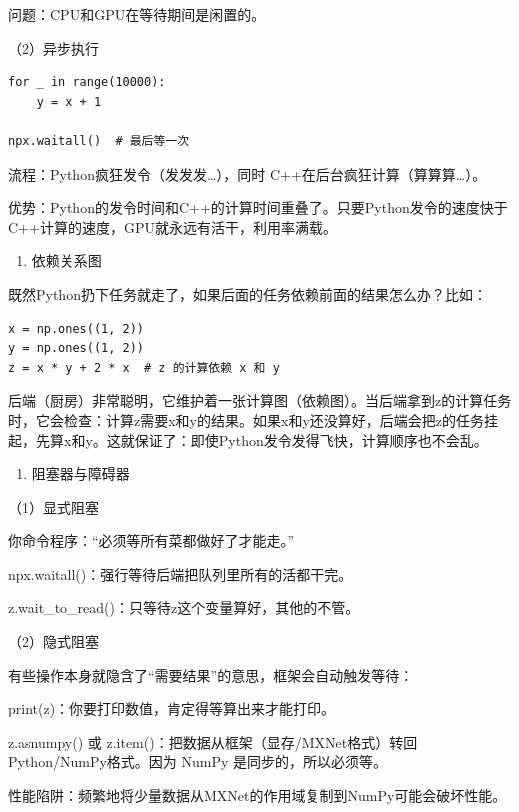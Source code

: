 问题：CPU和GPU在等待期间是闲置的。

（2）异步执行

\begin{verbatim}
for _ in range(10000):
    y = x + 1

npx.waitall()  # 最后等一次
\end{verbatim}

流程：Python疯狂发令（发发发\ldots），同时 C++在后台疯狂计算（算算算\ldots）。

优势：Python的发令时间和C++的计算时间重叠了。只要Python发令的速度快于C++计算的速度，GPU就永远有活干，利用率满载。

\begin{enumerate}
\def\labelenumi{\arabic{enumi}.}
\setcounter{enumi}{2}
\tightlist
\item
  依赖关系图
\end{enumerate}

既然Python扔下任务就走了，如果后面的任务依赖前面的结果怎么办？比如：

\begin{verbatim}
x = np.ones((1, 2))
y = np.ones((1, 2))
z = x * y + 2 * x  # z 的计算依赖 x 和 y
\end{verbatim}

后端（厨房）非常聪明，它维护着一张计算图（依赖图）。当后端拿到z的计算任务时，它会检查：计算z需要x和y的结果。如果x和y还没算好，后端会把z的任务挂起，先算x和y。这就保证了：即使Python发令发得飞快，计算顺序也不会乱。

\begin{enumerate}
\def\labelenumi{\arabic{enumi}.}
\setcounter{enumi}{3}
\tightlist
\item
  阻塞器与障碍器
\end{enumerate}

（1）显式阻塞

你命令程序：``必须等所有菜都做好了才能走。''

npx.waitall()：强行等待后端把队列里所有的活都干完。

z.wait\_to\_read()：只等待z这个变量算好，其他的不管。

（2）隐式阻塞

有些操作本身就隐含了``需要结果''的意思，框架会自动触发等待：

print(z)：你要打印数值，肯定得等算出来才能打印。

z.asnumpy() 或 z.item()：把数据从框架（显存/MXNet格式）转回Python/NumPy格式。因为 NumPy 是同步的，所以必须等。

性能陷阱：频繁地将少量数据从MXNet的作用域复制到NumPy可能会破坏性能。

